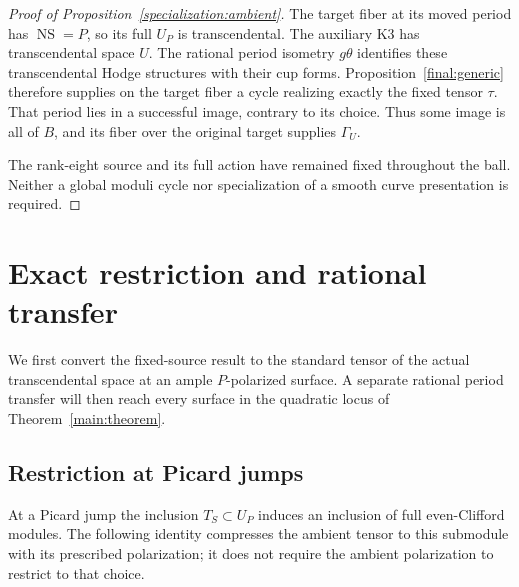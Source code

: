 \documentclass[11pt]{amsart}
\DeclareMathOperator{\NS}{NS}
\theoremstyle{definition}
\theoremstyle{remark}
\numberwithin{equation}{section}
\begin{document}
\begin{proof}[Proof of Proposition~\ref{specialization:ambient}]
The target fiber at its moved period has $\NS=P$, so its full $U_P$
is transcendental.  The auxiliary K3 has transcendental space $U$.
The rational period isometry $g\theta$ identifies these
transcendental Hodge structures with their cup forms.
Proposition~\ref{final:generic} therefore supplies on the target
fiber a cycle realizing exactly the fixed tensor $\tau$.
That period lies in a successful image, contrary to its choice.
Thus some image is all of $B$, and its fiber over the original
target supplies $\Gamma_U$.

The rank-eight source and its full action have remained fixed
throughout the ball.  Neither a global moduli cycle nor specialization
of a smooth curve presentation is required.
\end{proof}

\section{Exact restriction and rational transfer}
\label{transfer:section}

We first convert the fixed-source result to the standard tensor of
the actual transcendental space at an ample $P$-polarized surface.
A separate rational period transfer will then reach every surface in
the quadratic locus of Theorem~\ref{main:theorem}.

\subsection{Restriction at Picard jumps}

At a Picard jump the inclusion $T_S\subset U_P$ induces an inclusion
of full even-Clifford modules.  The following identity compresses the
ambient tensor to this submodule with its prescribed polarization;
it does not require the ambient polarization to restrict to that choice.
\end{document}
